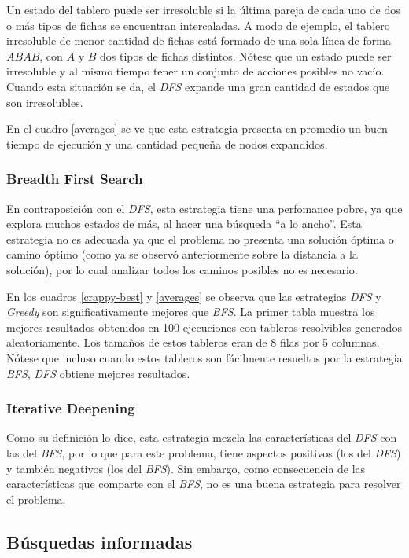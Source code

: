 \documentclass[a4paper,10pt]{article}
\begin{document}
    Un estado del tablero puede ser irresoluble si la última pareja de cada uno de dos o más tipos de fichas se encuentran intercaladas. A modo de ejemplo, el tablero irresoluble de menor cantidad de fichas está formado de una sola línea de forma $ABAB$, con $A$ y $B$ dos tipos de fichas distintos. Nótese que un estado puede ser irresoluble y al mismo tiempo tener un conjunto de acciones posibles no vacío. Cuando esta situación se da, el \textit{DFS} expande una gran cantidad de estados que son irresolubles.

    En el cuadro \ref{averages} se ve que esta estrategia presenta en promedio un buen tiempo de ejecución y una cantidad pequeña de nodos expandidos.
    
    \subsubsection{Breadth First Search}
    En contraposición con el \textit{DFS}, esta estrategia tiene una perfomance pobre, ya que explora muchos estados de más, al hacer una búsqueda ``a lo ancho''. Esta estrategia no es adecuada ya que el problema no presenta una solución óptima o camino óptimo (como ya se observó anteriormente sobre la distancia a la solución), por lo cual analizar todos los caminos posibles no es necesario.

    En los cuadros \ref{crappy-best} y \ref{averages} se observa que las estrategias \textit{DFS} y \textit{Greedy} son significativamente mejores que \textit{BFS}. La primer tabla muestra los mejores resultados obtenidos en 100 ejecuciones con tableros resolvibles generados aleatoriamente. Los tamaños de estos tableros eran de 8 filas por 5 columnas. Nótese que incluso cuando estos tableros son fácilmente resueltos por la estrategia \textit{BFS}, \textit{DFS} obtiene mejores resultados.

    \subsubsection{Iterative Deepening}

    Como su definición lo dice, esta estrategia mezcla las características del \textit{DFS} con las del \textit{BFS}, por lo que para este problema, tiene aspectos positivos (los del \textit{DFS}) y también negativos (los del \textit{BFS}). Sin embargo, como consecuencia de las características que comparte con el \textit{BFS}, no es una buena estrategia para resolver el problema.

\subsection{Búsquedas informadas}
    
\end{document}
